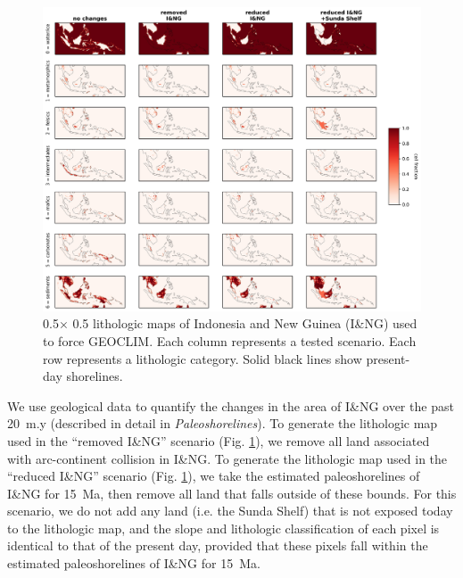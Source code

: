 \documentclass[11pt,letterpaper]{article}
\newcommand{\degrees}{\textdegree\xspace}
\begin{document}
\begin{figure}[h!]
    \centering
    \includegraphics[width=1\textwidth]{Manuscript/Figures/ING_fracs.jpg}
    \caption{0.5\degrees $\times$ 0.5\degrees lithologic maps of Indonesia and New Guinea (I\&NG) used to force GEOCLIM. Each column represents a tested scenario. Each row represents a lithologic category. Solid black lines show present-day shorelines.}
    \label{fig:ING_fracs}
\end{figure}

We use geological data to quantify the changes in the area of I\&NG over the past 20~m.y (described in detail in \textit{Paleoshorelines}). To generate the lithologic map used in the ``removed I\&NG'' scenario (Fig. \ref{fig:ING_fracs}), we remove all land associated with arc-continent collision in I\&NG. To generate the lithologic map used in the ``reduced I\&NG'' scenario (Fig. \ref{fig:ING_fracs}), we take the estimated paleoshorelines of I\&NG for 15~Ma, then remove all land that falls outside of these bounds. For this scenario, we do not add any land (i.e. the Sunda Shelf) that is not exposed today to the lithologic map, and the slope and lithologic classification of each pixel is identical to that of the present day, provided that these pixels fall within the estimated paleoshorelines of I\&NG for 15~Ma.
\end{document}
